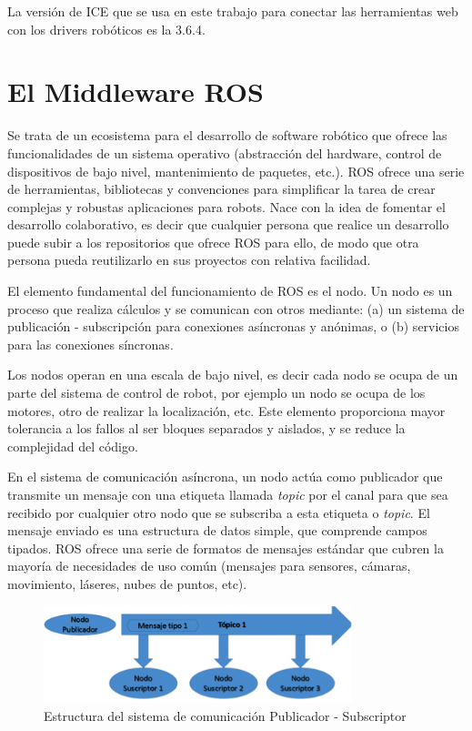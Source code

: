 La versión de ICE que se usa en este trabajo para conectar las herramientas web con los drivers robóticos es la 3.6.4.

\section{El Middleware ROS}
Se trata de un ecosistema para el desarrollo de software robótico que ofrece las funcionalidades de un sistema operativo (abstracción del hardware, control de dispositivos de bajo nivel, mantenimiento de paquetes, etc.). ROS ofrece una serie de herramientas, bibliotecas y convenciones para simplificar la tarea de crear complejas y robustas aplicaciones para robots. Nace con la idea de fomentar el desarrollo colaborativo, es decir que cualquier persona que realice un desarrollo puede subir a los repositorios que ofrece ROS para ello, de modo que otra persona pueda reutilizarlo en sus proyectos con relativa facilidad.

El elemento fundamental del funcionamiento de ROS es el nodo. Un nodo es un proceso que realiza cálculos y se comunican con otros mediante: (a) un sistema de publicación - subscripción para conexiones asíncronas y anónimas, o (b) servicios para las conexiones síncronas. 

Los nodos operan en una escala de bajo nivel, es decir cada nodo se ocupa de un parte del sistema de control de robot, por ejemplo un nodo se ocupa de los motores, otro de realizar la localización, etc. Este elemento proporciona mayor tolerancia a los fallos al ser bloques separados y aislados, y se reduce la complejidad del código.

En el sistema de comunicación asíncrona, un nodo actúa como publicador que transmite un mensaje con una etiqueta llamada \textit{topic} por el canal para que sea recibido por cualquier otro nodo que se subscriba a esta etiqueta o \textit{topic}. El mensaje enviado es una estructura de datos simple, que comprende campos tipados. ROS ofrece una serie de formatos de mensajes estándar que cubren la mayoría de necesidades de uso común (mensajes para sensores, cámaras, movimiento, láseres, nubes de puntos, etc).

\begin{figure}[H]
  \begin{center}
    \includegraphics[width=0.8\textwidth]{figures/publicadorsubscriptor.png}
		\caption{Estructura del sistema de comunicación Publicador - Subscriptor}
		\label{fig.publicadorsubscriptor}
		\end{center}
\end{figure}

